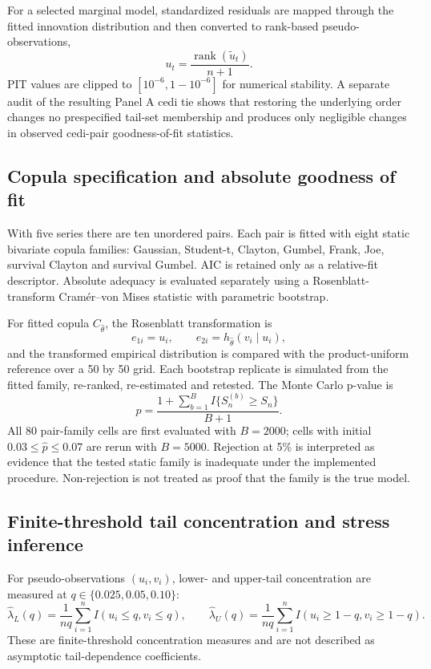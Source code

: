 For a selected marginal model, standardized residuals are mapped through the fitted innovation distribution and then converted to rank-based pseudo-observations,
\[
u_t=\frac{\operatorname{rank}(\tilde u_t)}{n+1}.
\]
PIT values are clipped to \([10^{-6},1-10^{-6}]\) for numerical stability. A separate audit of the resulting Panel A cedi tie shows that restoring the underlying order changes no prespecified tail-set membership and produces only negligible changes in observed cedi-pair goodness-of-fit statistics.

\subsection{Copula specification and absolute goodness of fit}

With five series there are ten unordered pairs. Each pair is fitted with eight static bivariate copula families: Gaussian, Student-t, Clayton, Gumbel, Frank, Joe, survival Clayton and survival Gumbel. AIC is retained only as a relative-fit descriptor. Absolute adequacy is evaluated separately using a Rosenblatt-transform Cram\'{e}r--von Mises statistic with parametric bootstrap.

For fitted copula \(C_{\hat\theta}\), the Rosenblatt transformation is
\[
e_{1i}=u_i,\qquad e_{2i}=h_{\hat\theta}(v_i\mid u_i),
\]
and the transformed empirical distribution is compared with the product-uniform reference over a 50 by 50 grid. Each bootstrap replicate is simulated from the fitted family, re-ranked, re-estimated and retested. The Monte Carlo p-value is
\[
\hat p=\frac{1+\sum_{b=1}^{B} I\{S_n^{(b)}\ge S_n\}}{B+1}.
\]
All 80 pair-family cells are first evaluated with \(B=2000\); cells with initial \(0.03\le\hat p\le0.07\) are rerun with \(B=5000\). Rejection at 5\% is interpreted as evidence that the tested static family is inadequate under the implemented procedure. Non-rejection is not treated as proof that the family is the true model.

\subsection{Finite-threshold tail concentration and stress inference}

For pseudo-observations \((u_i,v_i)\), lower- and upper-tail concentration are measured at \(q\in\{0.025,0.05,0.10\}\):
\[
\hat\lambda_L(q)=\frac{1}{nq}\sum_{i=1}^{n}I(u_i\le q,v_i\le q),\qquad
\hat\lambda_U(q)=\frac{1}{nq}\sum_{i=1}^{n}I(u_i\ge 1-q,v_i\ge 1-q).
\]
These are finite-threshold concentration measures and are not described as asymptotic tail-dependence coefficients.

